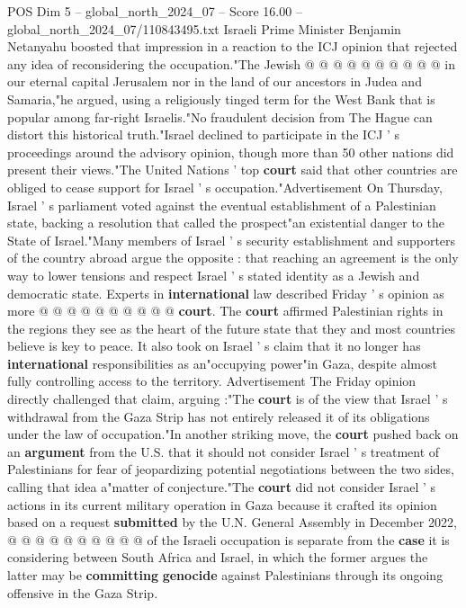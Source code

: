 \begin{textsample}{POS Dim 5 – global\_north\_2024\_07 – Score 16.00 – global\_north\_2024\_07/110843495.txt}
Israeli Prime Minister Benjamin Netanyahu boosted that impression in a reaction to the ICJ opinion that rejected any idea of reconsidering the occupation."The Jewish @ @ @ @ @ @ @ @ @ @ in our eternal capital Jerusalem nor in the land of our ancestors in Judea and Samaria,"he argued, using a religiously tinged term for the West Bank that is popular among far-right Israelis."No fraudulent decision from The Hague can distort this historical truth."Israel declined to participate in the ICJ ' s proceedings around the advisory opinion, though more than 50 other nations did present their views."The United Nations ' top \textbf{court} said that other countries are obliged to cease support for Israel ' s occupation."Advertisement On Thursday, Israel ' s parliament voted against the eventual establishment of a Palestinian state, backing a resolution that called the prospect"an existential danger to the State of Israel."Many members of Israel ' s security establishment and supporters of the country abroad argue the opposite : that reaching an agreement is the only way to lower tensions and respect Israel ' s stated identity as a Jewish and democratic state.
Experts in \textbf{international} law described Friday ' s opinion as more @ @ @ @ @ @ @ @ @ @ \textbf{court}.
The \textbf{court} affirmed Palestinian rights in the regions they see as the heart of the future state that they and most countries believe is key to peace.
It also took on Israel ' s claim that it no longer has \textbf{international} responsibilities as an"occupying power"in Gaza, despite almost fully controlling access to the territory.
Advertisement The Friday opinion directly challenged that claim, arguing :"The \textbf{court} is of the view that Israel ' s withdrawal from the Gaza Strip has not entirely released it of its obligations under the law of occupation."In another striking move, the \textbf{court} pushed back on an \textbf{argument} from the U.S. that it should not consider Israel ' s treatment of Palestinians for fear of jeopardizing potential negotiations between the two sides, calling that idea a"matter of conjecture."The \textbf{court} did not consider Israel ' s actions in its current military operation in Gaza because it crafted its opinion based on a request \textbf{submitted} by the U.N.
General Assembly in December 2022, @ @ @ @ @ @ @ @ @ @ of the Israeli occupation is separate from the \textbf{case} it is considering between South Africa and Israel, in which the former argues the latter may be \textbf{committing} \textbf{genocide} against Palestinians through its ongoing offensive in the Gaza Strip.

\end{textsample}
